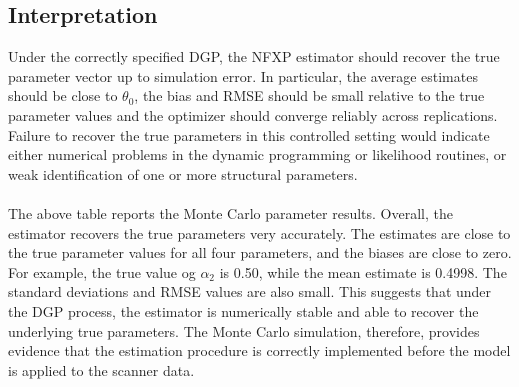 \subsection{Interpretation}

Under the correctly specified DGP, the NFXP estimator should recover the true parameter vector up to simulation error. In particular, the average estimates should be close to $\theta_0$, the bias and RMSE should be small relative to the true parameter values and the optimizer should converge reliably across replications. Failure to recover the true parameters in this controlled setting would indicate either numerical problems in the dynamic programming or likelihood routines, or weak identification of one or more structural parameters.
\\
\\
The above table reports the Monte Carlo parameter results. Overall, the estimator recovers the true parameters very accurately. The estimates are close to the true parameter values for all four parameters, and the biases are close to zero. For example, the true value og $\alpha_2$ is 0.50, while the mean estimate is 0.4998. The standard deviations and RMSE values are also small. This suggests that under the DGP process, the estimator is numerically stable and able to recover the underlying true parameters. The Monte Carlo simulation, therefore, provides evidence that the estimation procedure is correctly implemented before the model is applied to the scanner data. 

